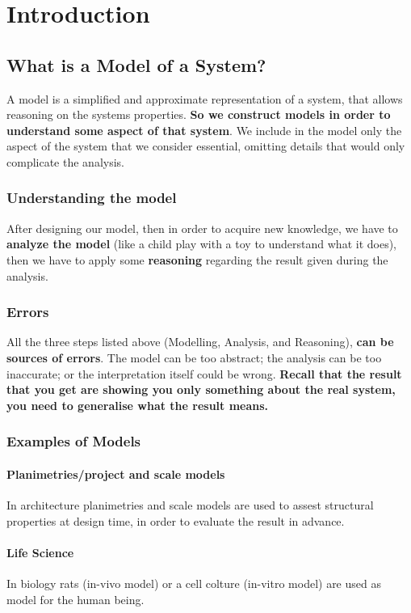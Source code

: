 \chapter{Introduction}

\section{What is a Model of a System?}
A model is a simplified and approximate representation of a system, that allows reasoning on the systems properties. \textbf{So we construct models in order to understand some aspect of that system}. We include in the model only the aspect of the system that we consider essential, omitting details that would only complicate the analysis.

\subsection{Understanding the model}
After designing our model, then in order to acquire new knowledge, we have to \textbf{analyze the model} (like a child play with a toy to understand what it does), then we have to apply some \textbf{reasoning} regarding the result given during the analysis. 

\subsection{Errors}
All the three steps listed above (Modelling, Analysis, and Reasoning), \textbf{can be sources of errors}. The model can be too abstract; the analysis can be too inaccurate; or the interpretation itself could be wrong. \textbf{Recall that the result that you get are showing you only something about the real system, you need to generalise what the result means.}

\subsection{Examples of Models}

\subsubsection{Planimetries/project and scale models}
In architecture planimetries and scale models are used to assest structural properties at design time, in order to evaluate the result in advance.

\subsubsection{Life Science}
In biology rats (in-vivo model) or a cell colture (in-vitro model) are used as model for the human being. 


